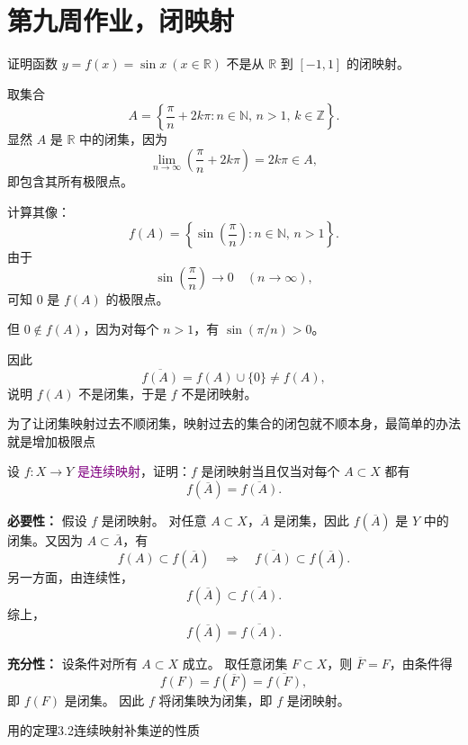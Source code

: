 \section{第九周作业，闭映射}
\begin{homework}[13]
证明函数 $y = f(x) = \sin x \ (x \in \mathbb{R})$ 不是从 $\mathbb{R}$ 到 $[-1,1]$ 的闭映射。
\end{homework}
\begin{solution}
取集合
\[
A=\left\{\frac{\pi}{n}+2k\pi : n\in\mathbb{N},\, n>1,\, k\in\mathbb{Z}\right\}.
\]
显然 $A$ 是 $\mathbb{R}$ 中的闭集，因为 
\[
\lim_{n\to\infty}\left(\frac{\pi}{n}+2k\pi\right)=2k\pi\in A,
\]
即包含其所有极限点。

计算其像：
\[
f(A)=\left\{\sin\left(\frac{\pi}{n}\right): n\in\mathbb{N},\, n>1\right\}.
\]
由于
\[
\sin\left(\frac{\pi}{n}\right)\longrightarrow 0 \quad (n\to\infty),
\]
可知 $0$ 是 $f(A)$ 的极限点。

但 $0\notin f(A)$，因为对每个 $n>1$，有 $\sin(\pi/n)>0$。

因此
\[
\overline{f(A)} = f(A)\cup\{0\} \neq f(A),
\]
说明 $f(A)$ 不是闭集，于是 $f$ 不是闭映射。

\end{solution}
\begin{dxtips}
    为了让闭集映射过去不顺闭集，映射过去的集合的闭包就不顺本身，最简单的办法就是增加极限点
\end{dxtips}
\begin{homework}[3.6]
设 $f : X \to Y$ \textcolor{purple}{是连续映射}，证明：$f$ 是闭映射当且仅当对每个 $A \subset X$ 都有
\[
f(\overline{A}) = \overline{f(A)}.
\]
\end{homework}
\begin{solution}
\textbf{必要性：} 假设 $f$ 是闭映射。  
对任意 $A \subset X$，$\overline{A}$ 是闭集，因此 $f(\overline{A})$ 是 $Y$ 中的闭集。又因为 $A \subset \overline{A}$，有
\[
f(A) \subset f(\overline{A}) \quad \Rightarrow \quad \overline{f(A)} \subset f(\overline{A}).
\]
另一方面，由连续性，
\[
f(\overline{A}) \subset \overline{f(A)}.
\]
综上，
\[
f(\overline{A}) = \overline{f(A)}.
\]

\textbf{充分性：} 设条件对所有 $A \subset X$ 成立。  
取任意闭集 $F \subset X$，则 $\overline{F}=F$，由条件得
\[
f(F)=f(\overline{F})=\overline{f(F)},
\]
即 $f(F)$ 是闭集。  
因此 $f$ 将闭集映为闭集，即 $f$ 是闭映射。

\end{solution}
\begin{dxtips}
    用的定理3.2连续映射补集逆的性质
\end{dxtips}
